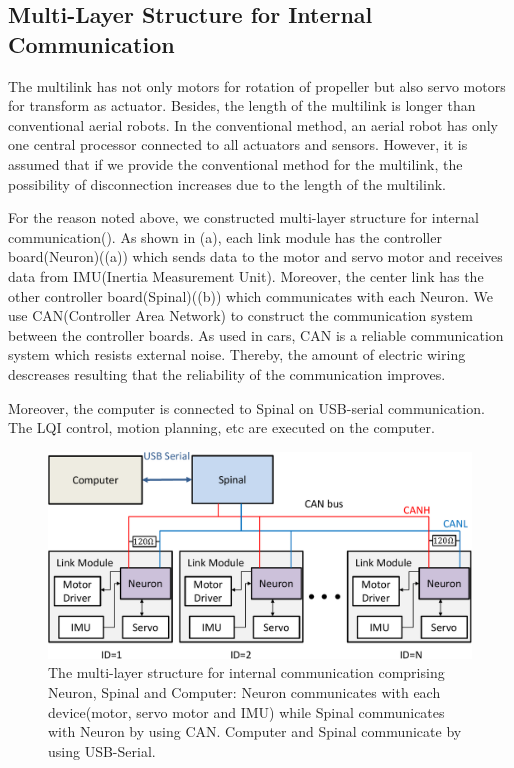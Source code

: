 \subsection{Multi-Layer Structure for Internal Communication}
The multilink has not only motors for rotation of propeller but also servo motors for transform as actuator. Besides, the length of the multilink is longer than conventional aerial robots. In the conventional method, an aerial robot has only one central processor connected to all actuators and sensors. However, it is assumed that if we provide the conventional method for the multilink, the possibility of disconnection increases due to the length of the multilink. 
\par
For the reason noted above, we constructed multi-layer structure for internal communication(). As shown in (a), each link module has the controller board(Neuron)((a)) which sends data to the motor and servo motor and receives data from IMU(Inertia Measurement Unit). Moreover, the center link has the other controller board(Spinal)((b)) which communicates with each Neuron. We use CAN(Controller Area Network)\cite{CAN} to construct the communication system between the controller boards. As used in cars, CAN is a reliable communication system which resists external noise. Thereby, the amount of electric wiring descreases resulting that the reliability of the communication improves.
\par
Moreover, the computer is connected to Spinal on USB-serial communication. The LQI control, motion planning, etc are executed on the computer.
\begin{figure}[t]
  \begin{center}
    \includegraphics[width=1.0\columnwidth]{figs/internal_communication.pdf}
  \end{center}
  \caption{The multi-layer structure for internal communication comprising Neuron, Spinal and Computer: Neuron communicates with each device(motor, servo motor and IMU) while Spinal communicates with Neuron by using CAN. Computer and Spinal communicate by using USB-Serial.\label{figure:internal_communication}}
\end{figure}
